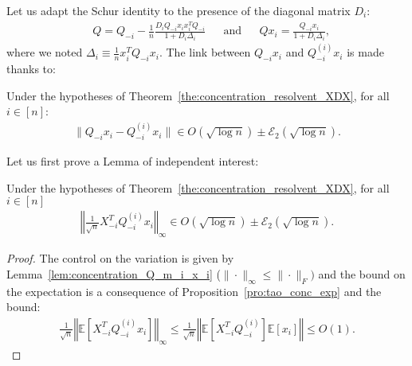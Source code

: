 \documentclass[a4papaer, titlepage]{book}
\begin{document}
 Let us adapt the Schur identity to the presence of the diagonal matrix $D_i$:
\begin{align*}%
  &Q=Q_{-i} -\frac{1}{n}\frac{D_iQ_{-i}x_ix_i^TQ_{-i}}{1 + D_i \Delta_i}&
  &\text{and}&
  &Qx_i=\frac{Q_{-i}x_i}{1+ D_i \Delta_i},
\end{align*}
where we noted $\Delta_i \equiv \frac1nx_i^TQ_{-i}x_i$.
 The link between $Q_{-i}x_i$ and $Q_{-i}^{(i)}x_i$ is made thanks to:
 \begin{lemma}\label{lem:norme_Q_m_i_Q_(i)_x_i} 
   Under the hypotheses of Theorem~\ref{the:concentration_resolvent_XDX}, for all $i\in[n]$: 
   \begin{align*}
     \|Q_{-i}x_i - Q^{(i)}_{-i}x_i\| \in O(\sqrt{\log n}) \pm \mathcal E_2(\sqrt{\log n}).
   \end{align*}
 \end{lemma}
 Let us first prove a Lemma of independent interest:
 \begin{lemma}\label{lem:concentration_norm_infty_YQx}
 Under the hypotheses of Theorem~\ref{the:concentration_resolvent_XDX}, for all $i\in[n]$
 \begin{align*}
   \left\Vert \frac{1}{\sqrt n} X_{-i}^T Q_{-i}^{(i)} x_i \right\Vert_\infty
   \in O(\sqrt {\log n}) \pm \mathcal E_2(\sqrt {\log n}).
 \end{align*}
   
 \end{lemma}
 \begin{proof}
   The control on the variation is given by Lemma~\ref{lem:concentration_Q_m_i_x_i} ($\|\cdot\|_\infty \leq \|\cdot \|_F)$ and the bound on the expectation is a consequence of Proposition~\ref{pro:tao_conc_exp} and the bound:
\begin{align}
  \frac{1}{\sqrt n} \left\Vert \mathbb E \left[ X_{-i}^T Q_{-i}^{(i)} x_i \right]\right\Vert_\infty \leq \frac{1}{\sqrt n} \left\Vert \mathbb E \left[ X_{-i}^T Q_{-i}^{(i)} \right]  \mathbb E \left[  x_i \right]\right\Vert \leq O(1).
\end{align}
 \end{proof}
\end{document}
